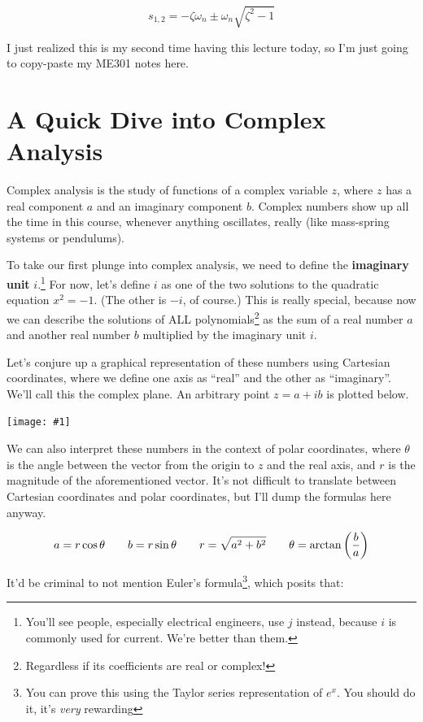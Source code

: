 \documentclass{report}
\newcommand{\bicture}[1]{
\begin{center}
    {\texttt{[image: \#1]}}
\end{center}}
\begin{document}
\begin{onehalfspacing}
\begin{flushleft}
\[s_{1, 2} = -\zeta \omega_n \pm \omega_n \sqrt{\zeta^2 - 1}\]

I just realized this is my second time having this lecture today, so I'm just going to copy-paste my ME301 notes here.

\section{A Quick Dive into Complex Analysis}

Complex analysis is the study of functions of a complex variable \(z\), where \(z\) has a real component \(a\) and an imaginary component \(b\). Complex numbers show up all the time in this course, whenever anything oscillates, really (like mass-spring systems or pendulums).

\medskip

To take our first plunge into complex analysis, we need to define the \textbf{imaginary unit} \(i\).\footnote{You'll see people, especially electrical engineers, use \(j\) instead, because \(i\) is commonly used for current. We're better than them.} For now, let's define \(i\) as one of the two solutions to the quadratic equation \(x^2 = -1\). (The other is \(-i\), of course.) This is really special, because now we can describe the solutions of ALL polynomials\footnote{Regardless if its coefficients are real or complex!} as the sum of a real number \(a\) and another real number \(b\) multiplied by the imaginary unit \(i\).

\medskip

Let's conjure up a graphical representation of these numbers using Cartesian coordinates, where we define one axis as ``real'' and the other as ``imaginary''. We'll call this the complex plane. An arbitrary point \(z = a+ ib\) is plotted below.

\bicture{2_cpx}

We can also interpret these numbers in the context of polar coordinates, where \(\theta\) is the angle between the vector from the origin to \(z\) and the real axis, and \(r\) is the magnitude of the aforementioned vector. It's not difficult to translate between Cartesian coordinates and polar coordinates, but I'll dump the formulas here anyway.

\vspace{-0.1in}
\[a = r \cos{\theta} \qquad b = r \sin{\theta} \qquad r = \sqrt{a^2 + b^2} \qquad \theta = \arctan\qty({\frac{b}{a}})\]

It'd be criminal to not mention Euler's formula\footnote{You can prove this using the Taylor series representation of \(e^{x}\). You should do it, it's \textit{very} rewarding}, which posits that:


\end{flushleft}
\end{onehalfspacing}
\end{document}
